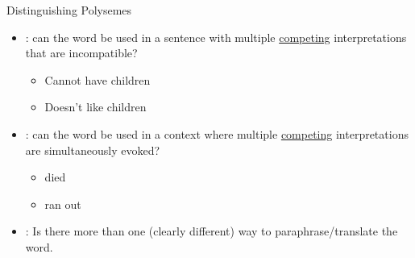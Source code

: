 \documentclass{beamer}
\begin{document}

\begin{frame}{Distinguishing Polysemes}

\begin{itemize}
\item {}: can the word be used in a sentence with
  multiple \underline{competing} interpretations that are incompatible? \\[1ex]
  \begin{itemize}
  \item Cannot have children
  \item Doesn't like children
  \end{itemize}
\item {}: can the word be used in a context where multiple
  \underline{competing} interpretations are simultaneously evoked? \\[1ex]
    \begin{itemize}
    \item died
    \item ran out
    \end{itemize}
  \task
  \item  {}: Is there more than one (clearly different) way to paraphrase/translate the word.
  \end{itemize}
\end{frame}
\end{document}
